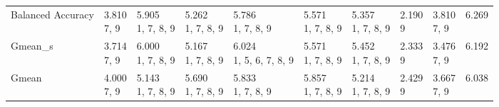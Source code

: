 \begin{tabular}{llllllllll}
Balanced Accuracy &     \makecell{3.810 \\ \scriptsize{7, 9}} &  \makecell{5.905 \\ \scriptsize{1, 7, 8, 9}} &  \makecell{5.262 \\ \scriptsize{1, 7, 8, 9}} &        \makecell{5.786 \\ \scriptsize{1, 7, 8, 9}} &  \makecell{5.571 \\ \scriptsize{1, 7, 8, 9}} &              \makecell{5.357 \\ \scriptsize{1, 7, 8, 9}} &  \makecell{2.190 \\ \scriptsize{9}} &  \makecell{3.810 \\ \scriptsize{7, 9}} &  \makecell{6.269 \\ \scriptsize{}} \\
Gmean_s           &     \makecell{3.714 \\ \scriptsize{7, 9}} &  \makecell{6.000 \\ \scriptsize{1, 7, 8, 9}} &  \makecell{5.167 \\ \scriptsize{1, 7, 8, 9}} &  \makecell{6.024 \\ \scriptsize{1, 5, 6, 7, 8, 9}} &  \makecell{5.571 \\ \scriptsize{1, 7, 8, 9}} &              \makecell{5.452 \\ \scriptsize{1, 7, 8, 9}} &  \makecell{2.333 \\ \scriptsize{9}} &  \makecell{3.476 \\ \scriptsize{7, 9}} &  \makecell{6.192 \\ \scriptsize{}} \\
Gmean             &     \makecell{4.000 \\ \scriptsize{7, 9}} &  \makecell{5.143 \\ \scriptsize{1, 7, 8, 9}} &  \makecell{5.690 \\ \scriptsize{1, 7, 8, 9}} &        \makecell{5.833 \\ \scriptsize{1, 7, 8, 9}} &  \makecell{5.857 \\ \scriptsize{1, 7, 8, 9}} &              \makecell{5.214 \\ \scriptsize{1, 7, 8, 9}} &  \makecell{2.429 \\ \scriptsize{9}} &  \makecell{3.667 \\ \scriptsize{7, 9}} &  \makecell{6.038 \\ \scriptsize{}} \\
\bottomrule
\end{tabular}
